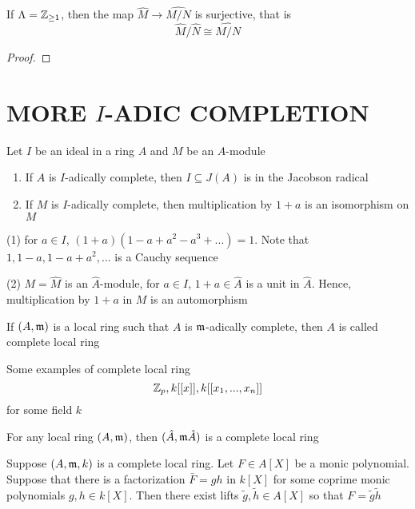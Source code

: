 \begin{proposition}
	If $\Lambda = \mathbb{Z}_{\geq 1}$, then the map $\hat{M} \to \widehat{M / N}$ is surjective, that is
	$$
		\hat{M} / \hat{N} \cong \widehat{M / N}
	$$
\end{proposition}

\begin{proof}
\end{proof}

\section{MORE $I$-ADIC COMPLETION}

\begin{proposition}
	Let $I$ be an ideal in a ring $A$ and $M$ be an $A$-module
	\begin{enumerate}
		\item If $A$ is $I$-adically complete, then $I \subseteq J(A)$ is in the Jacobson radical
		\item If $M$ is $I$-adically complete, then multiplication by $1 + a$ is an isomorphism on $M$
	\end{enumerate}
\end{proposition}

\begin{longproof}
	(1) for $a \in I$, $(1 + a)(1 - a + a^2 - a^3 + ...) = 1$. Note that $1, 1-a, 1-a+a^2, ...$ is a Cauchy sequence
	
	(2) $M = \hat{M}$ is an $\hat{A}$-module, for $a \in I$, $1 + a \in \hat{A}$ is a unit in $\hat{A}$. Hence, multiplication by $1 + a$ in $M$ is an automorphism
\end{longproof}

\begin{definition}
	If $(A, \mathfrak{m})$ is a local ring such that $A$ is $\mathfrak{m}$-adically complete, then $A$ is called complete local ring
\end{definition}

\begin{remark}
	Some examples of complete local ring
	$$
		\mathbb{Z}_p, k[[x]], k[[x_1, ..., x_n]]
	$$
	for some field $k$
\end{remark}

\begin{remark}
	For any local ring $(A, \mathfrak{m})$, then $(\hat{A}, \mathfrak{m} \hat{A})$ is a complete local ring
\end{remark}

\begin{theorem}
	Suppose $(A, \mathfrak{m}, k)$ is a complete local ring. Let $F \in A[X]$ be a monic polynomial. Suppose that there is a factorization $\bar{F} = gh$ in $k[X]$ for some coprime monic polynomials $g, h \in k[X]$. Then there exist lifts $\tilde{g}, \tilde{h} \in A[X]$ so that $F = \tilde{g} \tilde{h}$
\end{theorem}


